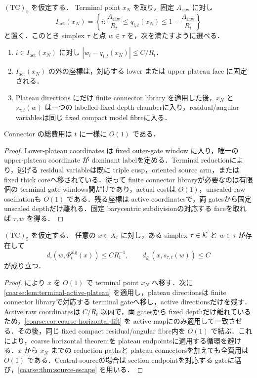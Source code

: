 \documentclass[a4paper,11pt]{ltjsarticle}
\numberwithin{equation}{section}
\theoremstyle{plain}
\theoremstyle{definition}
\theoremstyle{remark}
\begin{document}
\begin{lemma}\label{coarse:lem:terminal-active-plateau}
$\mathrm{(TC)}_5$ を仮定する．
Terminal point $x_N$ を取り，固定 $A_{\mathrm{raw}}$ に対し
\[
 I_{\mathrm{act}}(x_N)=
 \left\{i:\frac{A_{\mathrm{raw}}}{R_t}\le q_{i,t}(x_N)
 \le1-\frac{A_{\mathrm{raw}}}{R_t}\right\}
\]
と置く．このとき simplex $\tau$ と点 $w\in\tau$ を，次を満たすように選べる．
\begin{enumerate}[label=\textup{(AP\arabic*)}]
\item $i\in I_{\mathrm{act}}(x_N)$ に対し $|w_i-q_{i,t}(x_N)|\le C/R_t$．
\item $I_{\mathrm{act}}(x_N)$ の外の座標は，対応する lower または upper plateau face に固定される．
\item Plateau directions にだけ finite connector library を適用した後，$x_N$ と $s_{\tau,t}(w)$ は一つの labelled fixed-depth chamberに入り，residual/angular variablesは同じ fixed compact model fibreに入る．
\end{enumerate}
Connector の総費用は $t$ に一様に $O(1)$ である．
\end{lemma}

\begin{proof}
Lower-plateau coordinates は fixed outer-gate window に入り，唯一の upper-plateau coordinate が dominant labelを定める．Terminal reductionにより，逃げる residual variableは既に triple cusp，oriented source arm，または fixed thick coreへ移されている．従って finite connector libraryが必要なのは有限個の terminal gate windows間だけであり，actual costは $O(1)$，unscaled raw oscillationも $O(1)$ である．残る座標は active coordinatesで，両 gatesから固定 unscaled depthだけ離れる．固定 barycentric subdivisionの対応する faceを取れば $\tau,w$ を得る．
\end{proof}

\begin{proposition}\label{coarse:prop:endpoint-anchor}
$\mathrm{(TC)}_5$ を仮定する．
任意の $x\in X_t$ に対し，ある simplex $\tau\in\mathcal K$ と $w\in\tau$ が存在して
\[
 d_\square(w,\Phi_t^{\mathrm{alg}}(x))\le CR_t^{-1},
 \qquad
 d_{g_t}(x,s_{\tau,t}(w))\le C
\]
が成り立つ．
\end{proposition}

\begin{proof}
 により $x$ を $O(1)$ で terminal point $x_N$ へ移す．次に \cref{coarse:lem:terminal-active-plateau} を適用し，plateau directionsは finite connector libraryで対応する terminal gateへ移し，active directionsだけを残す．Active raw coordinatesは $C/R_t$ 以内で，両 gatesから fixed depthだけ離れているため，\cref{coarse:cor:coarse-horizontal-lift} を active mapにのみ適用して一致させる．その後，同じ fixed compact residual/angular fibre内を $O(1)$ で結ぶ．これにより，coarse horizontal theoremを plateau endpointsに適用する循環を避ける．$x$ から $x_N$ までの reduction pathsと plateau connectorsを加えても全費用は $O(1)$ である．Central sourceの場合は section endpointを対応する gateに選び，\cref{coarse:thm:source-escape} を用いる．
\end{proof}
\end{document}
